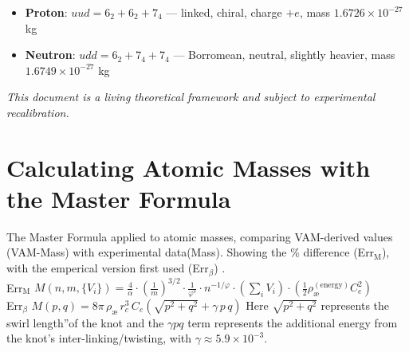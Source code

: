 \documentclass[12pt]{article}
\begin{document}
\begin{itemize}
    \item \textbf{Proton}: \( uud = 6_2 + 6_2 + 7_4 \) — linked, chiral, charge \(+e\), mass \(1.6726 \times 10^{-27}\) kg
    \item \textbf{Neutron}: \( udd = 6_2 + 7_4 + 7_4 \) — Borromean, neutral, slightly heavier, mass \(1.6749 \times 10^{-27}\) kg
\end{itemize}

\vspace{0.5em}
\noindent
\textit{This document is a living theoretical framework and subject to experimental recalibration.}

      \appendix
      \section*{Calculating Atomic Masses with the Master Formula}
  The Master Formula applied to atomic masses, comparing VAM-derived values (VAM-Mass) with experimental data(Mass). Showing the \% difference (Err$_\text{M}$), with the emperical version first used (Err$_\beta$)  .   \\ Err$_\text{M}$ \( M(n, m, \{V_i\}) = \frac{4}{\alpha} \cdot \left( \frac{1}{m} \right)^{3/2} \cdot \frac{1}{\varphi^s} \cdot n^{-1/\varphi} \cdot \left( \sum_i V_i \right) \cdot \left( \frac{1}{2} \rho_\text{\ae}^{(\text{energy})} C_e^2 \right) \)\\
  Err$_\beta$ \(  M(p,q) = 8\pi\,\rho_{\text{\ae}}\,r_c^3\,C_e \left(\sqrt{p^2 + q^2} + \gamma\, p\,q\right) \)
  Here $\sqrt{p^2+q^2}$ represents the \grqq swirl length\textquotedblright of the knot and the $\gamma p q$ term represents the additional energy from the knot's inter-linking/twisting, with $\gamma \approx 5.9\times10^{-3}$.
  \newcommand{\heartmarker}{
  \tikz[baseline=-1.4ex, xshift=-4ex, scale=0.06]
    \draw[fill=pink,draw=none]
    (0,0) .. controls (-1,1) and (-2,0.5) .. (-2,-0.5)
            .. controls (-2,-2) and (0,-3) .. (0,-4)
            .. controls (0,-3) and (2,-2) .. (2,-0.5)
            .. controls (2,0.5) and (1,1) .. (0,0);
}
\end{document}
